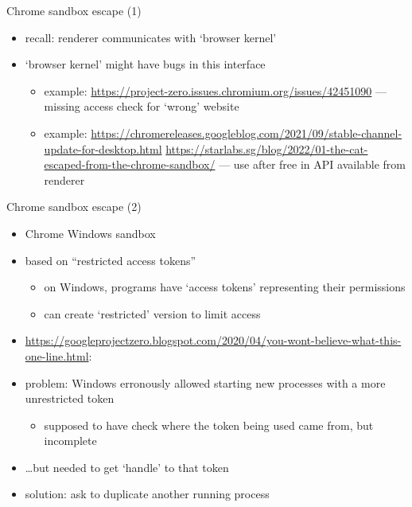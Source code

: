 \begin{frame}{Chrome sandbox escape (1)}
    \begin{itemize}
    \item recall: renderer communicates with `browser kernel'
    \item `browser kernel' might have bugs in this interface
        \begin{itemize}
        \item example: \url{https://project-zero.issues.chromium.org/issues/42451090} --- missing access check for `wrong' website
        \item example: \url{https://chromereleases.googleblog.com/2021/09/stable-channel-update-for-desktop.html} \url{https://starlabs.sg/blog/2022/01-the-cat-escaped-from-the-chrome-sandbox/} --- use after free in API available from renderer
        \end{itemize}
    \end{itemize}
\end{frame}

\begin{frame}{Chrome sandbox escape (2)}
    \begin{itemize}
    \item Chrome Windows sandbox
    \item based on ``restricted access tokens''
        \begin{itemize}
        \item on Windows, programs have `access tokens' representing their permissions
        \item can create `restricted' version to limit access
        \end{itemize}
    \vspace{.5cm}
    \item \url{https://googleprojectzero.blogspot.com/2020/04/you-wont-believe-what-this-one-line.html}:
    \item problem: Windows erronously allowed starting new processes with a more unrestricted token
        \begin{itemize}
        \item supposed to have check where the token being used came from, but incomplete
        \end{itemize}
    \item \ldots but needed to get `handle' to that token
    \item solution: ask to duplicate another running process
    \end{itemize}
\end{frame}
